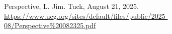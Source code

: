\documentclass[10pt]{article}
\begin{document}
\begin{multicols}{2}
\begin{thebibliography}{9}
	{\footnotesize
		
	 Perspective, L. Jim. Tuck, August 21, 2025. \url{https://www.ucg.org/sites/default/files/public/2025-08/Perspective%20082325.pdf}
	
	}
\end{thebibliography}

\end{multicols}


\end{document}
